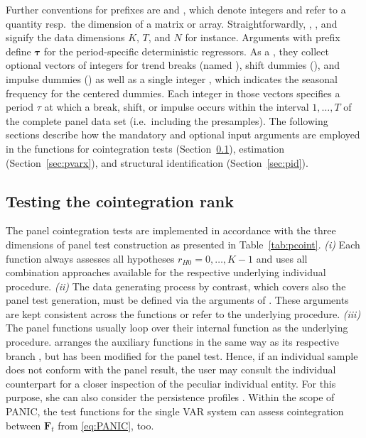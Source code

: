 Further conventions for prefixes are  and , which denote integers and refer to a quantity resp.~the dimension of a matrix or array. Straightforwardly, , , and  signify the data dimensions $ K $, $ T $, and $ N $ for instance. Arguments with prefix \mbox{} define $ \boldsymbol{\tau} $ for the period-specific deterministic regressors. As a , they collect optional vectors of integers for trend breaks (named ), shift dummies (), and impulse dummies () as well as a single integer , which indicates the seasonal frequency for the centered dummies. Each integer in those vectors specifies a period $ \tau $ at which a break, shift, or impulse occurs within the interval $ 1,\ldots,T $ of the complete panel data set (i.e.~including the presamples). The following sections describe how the mandatory and optional input arguments are employed in the  functions for cointegration tests (Section~\ref{sec:pcoint}), estimation (Section~\ref{sec:pvarx}), and structural identification (Section~\ref{sec:pid}).


\subsection{Testing the cointegration rank} \label{sec:pcoint}
The panel cointegration tests are implemented in accordance with the three dimensions of panel test construction as presented in Table~\ref{tab:pcoint}. \textit{(i)} Each  function always assesses all hypotheses $ r_{H0} = 0,\ldots,K-1 $ and uses all combination approaches available for the respective underlying individual procedure. \textit{(ii)} The data generating process by contrast, which covers also the panel test generation, must be defined via the arguments of \mbox{}. These arguments are kept consistent across the functions or refer to the underlying procedure. \textit{(iii)} The panel functions  usually loop over their internal function  as the underlying procedure.  arranges the auxiliary functions in the same way as its respective branch \mbox{}, but has been modified for the panel test. Hence, if an individual sample does not conform with the panel result, the user may consult the individual counterpart  for a closer inspection of the peculiar individual entity. For this purpose, she can also consider the persistence profiles . Within the scope of PANIC, the test functions  for the single VAR system can assess cointegration between $ \boldsymbol{F}_t $ from \eqref{eq:PANIC}, too.

